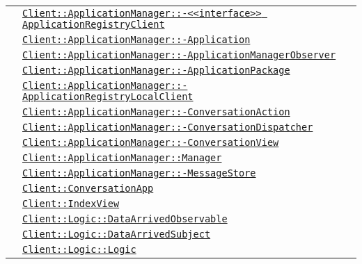 \begin{longtable}{|>{\centering}m{3cm}|m{10cm}<{\centering}|}
& \hyperref[Client::ApplicationManager::<<interface>> ApplicationRegistryClient]{\texttt{Client::ApplicationManager::-\linebreak <<interface>> ApplicationRegistryClient}}\\
& \hyperref[Client::ApplicationManager::Application]{\texttt{Client::ApplicationManager::-\linebreak Application}}\\
& \hyperref[Client::ApplicationManager::ApplicationManagerObserver]{\texttt{Client::ApplicationManager::-\linebreak ApplicationManagerObserver}}\\
& \hyperref[Client::ApplicationManager::ApplicationPackage]{\texttt{Client::ApplicationManager::-\linebreak ApplicationPackage}}\\
& \hyperref[Client::ApplicationManager::ApplicationRegistryLocalClient]{\texttt{Client::ApplicationManager::-\linebreak ApplicationRegistryLocalClient}}\\
& \hyperref[Client::ApplicationManager::ConversationAction]{\texttt{Client::ApplicationManager::-\linebreak ConversationAction}}\\
& \hyperref[Client::ApplicationManager::ConversationDispatcher]{\texttt{Client::ApplicationManager::-\linebreak ConversationDispatcher}}\\
& \hyperref[Client::ApplicationManager::ConversationView]{\texttt{Client::ApplicationManager::-\linebreak ConversationView}}\\
& \hyperref[Client::ApplicationManager::Manager]{\texttt{Client::ApplicationManager::Manager}}\\
& \hyperref[Client::ApplicationManager::MessageStore]{\texttt{Client::ApplicationManager::-\linebreak MessageStore}}\\
& \hyperref[Client::ConversationApp]{\texttt{Client::ConversationApp}}\\
& \hyperref[Client::IndexView]{\texttt{Client::IndexView}}\\
& \hyperref[Client::Logic::DataArrivedObservable]{\texttt{Client::Logic::DataArrivedObservable}}\\
& \hyperref[Client::Logic::DataArrivedSubject]{\texttt{Client::Logic::DataArrivedSubject}}\\
& \hyperref[Client::Logic::Logic]{\texttt{Client::Logic::Logic}}\\

\end{longtable}
